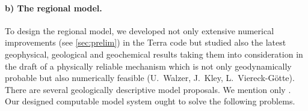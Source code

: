 \documentclass[twoside,10pt]{article}
\begin{document}
\vspace{-2.5ex}
\paragraph{b) The regional model.}
To design the regional model, we developed not only extensive numerical improvements (see \ref{sec:prelim}) in the Terra code but studied also the latest geophysical, geological and geochemical results taking them into consideration in the draft of a physically reliable mechanism which is not only geodynamically probable but also numerically feasible (U.~Walzer, J.~Kley, L.~Viereck-G\"otte).
There are several geologically descriptive model proposals. We mention only \cite{Gutscher2000,Haschke2006,Oncken2006,Ramos2009,Kay2009,DeCelles2009}.
Our designed computable model system ought to solve the following problems.
\end{document}
